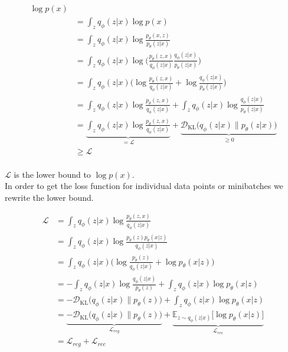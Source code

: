 \begin{align*}
  \log p(x)\\
  &= \int_z q_\phi(z|x) \log p(x)\\
  &= \int_z q_\phi(z|x) \log \frac{p_\theta(x,z)}{p_\theta(z|x)} \tag{Bayes' rule}\\
  &= \int_z q_\phi(z|x) \log\bigg(\frac{p_\theta(z,x)}{q_\phi(z|x)} \frac{q_\phi(z|x)}{p_\theta(z|x)}\bigg) \tag{Chain rule}\\
  &= \int_z q_\phi(z|x) \bigg(\log\frac{p_\theta(z,x)}{q_\phi(z|x)} + \log\frac{q_\phi(z|x)}{p_\theta(z|x)}\bigg)\\
  &= \int_z q_\phi(z|x) \log \frac{p_\theta(z,x)}{q_\phi(z|x)} + \int_z q_\phi(z|x) \log\frac{q_\phi(z|x)}{p_\theta(z|x)}\\
  &= \underbrace{\int_z q_\phi(z|x) \log \frac{p_\theta(z,x)}{q_\phi(z|x)}}_{= \mathcal{L}}+ \underbrace{\mathcal{D}_{\mathrm{KL}}\big(q_\phi(z|x) \| p_\theta(z|x)\big)}_{\geq 0}\\
  &\geq \mathcal{L}\\
\end{align*}

$\mathcal{L}$ is the lower bound to $\log p(x)$.\\
In order to get the loss function for individual data points or minibatches we rewrite the lower bound.

\begin{align*}
  \mathcal{L}
  &= \int_z q_\phi(z|x) \log\frac{p_\theta(z,x)}{q_\phi(z|x)}\\
  &= \int_z q_\phi(z|x) \log\frac{p_\theta(z) p_\theta(x|z)}{q_\phi(z|x)} \tag{we assume that x is conditionally dependent on z}\\
  &= \int_z q_\phi(z|x) \bigg(\log\frac{p_\theta(z)}{q_\phi(z|x)} + \log p_\theta(x|z)\bigg)\\
  &= -\int_z q_\phi(z|x) \log\frac{q_\phi(z|x)}{p_\theta(z)} + \int_z q_\phi(z|x) \log p_\theta(x|z)\\
  &= -\mathcal{D}_{\mathrm{KL}}\big(q_\phi(z|x) \| p_\theta(z)\big) + \int_z q_\phi(z|x) \log p_\theta(x|z)\\
  &= \underbrace{-\mathcal{D}_{\mathrm{KL}}\big(q_\phi(z|x) \| p_\theta(z)\big)}_{\mathcal{L}_{reg}} + \underbrace{\mathbb{E}_{z \sim q_\phi(z|x)}\big[ \log p_\theta(x|z)\big]}_{\mathcal{L}_{rec}}\\
  &= \mathcal{L}_{reg} + \mathcal{L}_{rec}
\end{align*}
